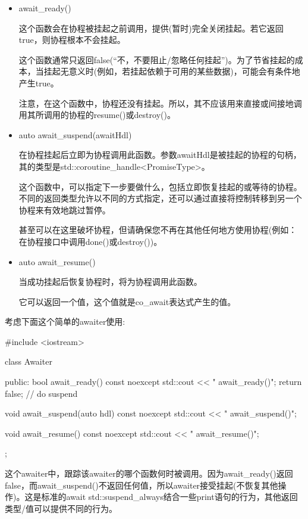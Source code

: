 \begin{itemize}
\item 
await\_ready()

这个函数会在协程被挂起之前调用，提供(暂时)完全关闭挂起。若它返回true，则协程根本不会挂起。

这个函数通常只返回false(“不，不要阻止/忽略任何挂起”)。为了节省挂起的成本，当挂起无意义时(例如，若挂起依赖于可用的某些数据)，可能会有条件地产生true。

注意，在这个函数中，协程还没有挂起。所以，其不应该用来直接或间接地调用其所调用的协程的resume()或destroy()。

\item 
auto await\_suspend(awaitHdl)

在协程挂起后立即为协程调用此函数。参数awaitHdl是被挂起的协程的句柄，其的类型是std::coroutine\_handle<PromiseType>。

这个函数中，可以指定下一步要做什么，包括立即恢复挂起的或等待的协程。不同的返回类型允许以不同的方式指定，还可以通过直接将控制转移到另一个协程来有效地跳过暂停。

甚至可以在这里破坏协程，但请确保您不再在其他任何地方使用协程(例如：在协程接口中调用done()或destroy())。

\item 
auto await\_resume()

当成功挂起后恢复协程时，将为协程调用此函数。

它可以返回一个值，这个值就是co\_await表达式产生的值。
\end{itemize}

考虑下面这个简单的awaiter使用:


\begin{cpp}
#include <iostream>

class Awaiter {
	public:
	bool await_ready() const noexcept {
		std::cout << " await_ready()\n";
		return false; // do suspend
	}
	
	void await_suspend(auto hdl) const noexcept {
		std::cout << " await_suspend()\n";
	}
	
	void await_resume() const noexcept {
		std::cout << " await_resume()\n";
	}
};
\end{cpp}

这个awaiter中，跟踪该awaiter的哪个函数何时被调用。因为await\_ready()返回false，而await\_suspend()不返回任何值，所以awaiter接受挂起(不恢复其他操作)。这是标准的await std::suspend\_always{}结合一些print语句的行为，其他返回类型/值可以提供不同的行为。

